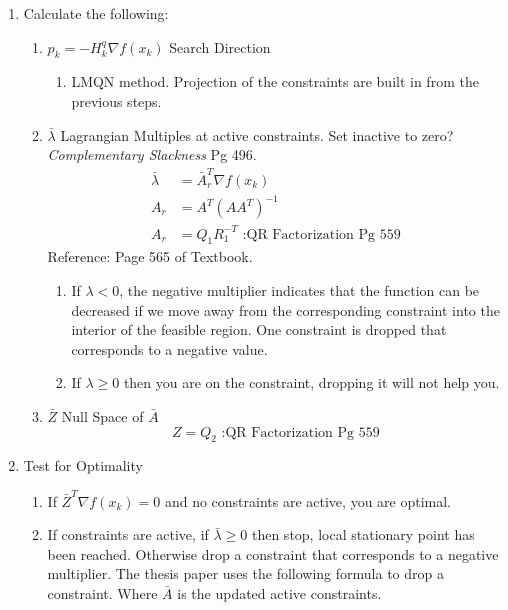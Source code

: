 \documentclass{article}
\begin{document}
\begin{enumerate}
    \item Calculate the following:
    \begin{enumerate}
        \item $p_{k} = -H_{k}^{q}\nabla f(x_{k})$ Search Direction
        \begin{enumerate}
            \item LMQN method. Projection of the constraints are built in from the previous steps.
        \end{enumerate}
        \item $\bar{\lambda}$ Lagrangian Multiples at active constraints. Set inactive to zero? \textit{Complementary Slackness} Pg 496.
        \begin{equation*}
        \begin{aligned}
            \bar{\lambda} & = \bar{A}^{T}_{r}\nabla f(x_{k}) \\
            A_{r} & = A^{T}(AA^{T})^{-1} \\
            A_{r} & = Q_{1}R_{1}^{-T} \text{ :QR Factorization Pg 559}
        \end{aligned}
        \end{equation*}
        Reference: Page 565 of Textbook.
        \begin{enumerate}
            \item If $\lambda < 0$, the negative multiplier indicates that the function can be decreased if we move away from the corresponding constraint into the interior of the feasible region. One constraint is dropped that corresponds to a negative value.
            \item If $\lambda \geq 0$ then you are on the constraint, dropping it will not help you.
        \end{enumerate}

        \item $\bar{Z}$ Null Space of $\bar{A}$
        $$Z = Q_{2} \text{ :QR Factorization Pg 559}$$
        
    \end{enumerate}
    
    \item Test for Optimality
    \begin{enumerate}
        \item If $\bar{Z}^{T}\nabla f(x_{k}) = 0$ and no constraints are active, you are optimal.
        \item If constraints are active, if $\bar{\lambda} \geq 0$ then stop, local stationary point has been reached. Otherwise drop a constraint that corresponds to a negative multiplier. The thesis paper uses the following formula to drop a constraint. Where $\bar{A}$ is the updated active constraints.


\end{enumerate}
\end{enumerate}
\end{document}
